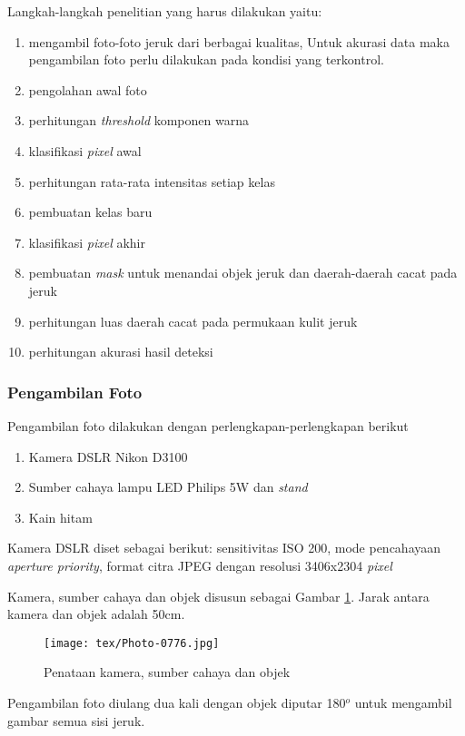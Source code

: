 \documentclass[laporan.tex]{subfiles}
\begin{document}
Langkah-langkah penelitian yang harus dilakukan yaitu:

\begin{enumerate}
\item mengambil foto-foto jeruk dari berbagai kualitas, Untuk akurasi data maka pengambilan foto perlu dilakukan pada kondisi yang terkontrol.
\item pengolahan awal foto
\item perhitungan \emph{threshold} komponen warna
\item klasifikasi \emph{pixel} awal
\item perhitungan rata-rata intensitas setiap kelas
\item pembuatan kelas baru
\item klasifikasi \emph{pixel} akhir
\item pembuatan \emph{mask} untuk menandai objek jeruk dan daerah-daerah cacat pada jeruk
\item perhitungan luas daerah cacat pada permukaan kulit jeruk
\item perhitungan akurasi hasil deteksi
\end{enumerate}

\subsubsection{Pengambilan Foto} \label{photoshoot}

Pengambilan foto dilakukan dengan perlengkapan-perlengkapan berikut

\begin{enumerate}
\item Kamera DSLR Nikon D3100
\item Sumber cahaya lampu LED Philips 5W dan \emph{stand}
\item Kain hitam
\end{enumerate}

Kamera DSLR diset sebagai berikut: sensitivitas ISO 200, mode pencahayaan \emph{aperture priority}, format citra JPEG dengan resolusi 3406x2304 \emph{pixel}

Kamera, sumber cahaya dan objek disusun sebagai Gambar \ref{fig:setup}. Jarak antara kamera dan objek adalah 50cm.
\begin{figure}[h]
\centering
\texttt{[image: tex/Photo-0776.jpg]}
\caption{Penataan kamera, sumber cahaya dan objek}
\label{fig:setup}
\end{figure}

Pengambilan foto diulang dua kali dengan objek diputar 180$^o$ untuk mengambil gambar semua sisi jeruk.
\end{document}
